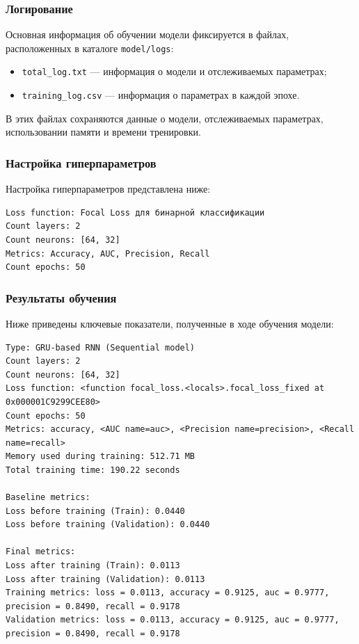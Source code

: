 \documentclass[a4paper,12pt]{article}
\begin{document}
\begin{flushleft}
\subsubsection{Логирование}

Основная информация об обучении модели фиксируется в файлах, расположенных в каталоге \texttt{model/logs}:
\begin{itemize}
    \item \texttt{total\_log.txt} --- информация о модели и отслеживаемых параметрах;
    \item \texttt{training\_log.csv} --- информация о параметрах в каждой эпохе.
\end{itemize}
В этих файлах сохраняются данные о модели, отслеживаемых параметрах, использовании памяти и времени тренировки.

\subsubsection{Настройка гиперпараметров}

Настройка гиперпараметров представлена ниже:
\begin{lstlisting}
Loss function: Focal Loss для бинарной классификации
Count layers: 2
Count neurons: [64, 32]
Metrics: Accuracy, AUC, Precision, Recall
Count epochs: 50
\end{lstlisting}

\subsubsection{Результаты обучения}

Ниже приведены ключевые показатели, полученные в ходе обучения модели:
\begin{lstlisting}
Type: GRU-based RNN (Sequential model)
Count layers: 2
Count neurons: [64, 32]
Loss function: <function focal_loss.<locals>.focal_loss_fixed at 0x000001C9299CEE80>
Count epochs: 50
Metrics: accuracy, <AUC name=auc>, <Precision name=precision>, <Recall name=recall>
Memory used during training: 512.71 MB
Total training time: 190.22 seconds

Baseline metrics:
Loss before training (Train): 0.0440
Loss before training (Validation): 0.0440

Final metrics:
Loss after training (Train): 0.0113
Loss after training (Validation): 0.0113
Training metrics: loss = 0.0113, accuracy = 0.9125, auc = 0.9777, precision = 0.8490, recall = 0.9178
Validation metrics: loss = 0.0113, accuracy = 0.9125, auc = 0.9777, precision = 0.8490, recall = 0.9178
\end{lstlisting}


\end{flushleft}
\end{document}
